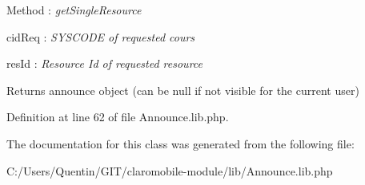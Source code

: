 \begin{DoxyPre}        Method : {\itshape getSingleResource\/}\end{DoxyPre}



\begin{DoxyPre}        cidReq : {\itshape SYSCODE of requested cours\/}\end{DoxyPre}



\begin{DoxyPre}        resId : {\itshape Resource Id of requested resource\/}\end{DoxyPre}


\begin{DoxyReturn}{Returns}
announce object (can be null if not visible for the current user) 
\end{DoxyReturn}


Definition at line 62 of file Announce.lib.php.



The documentation for this class was generated from the following file:\begin{DoxyCompactItemize}
\item 
C:/Users/Quentin/GIT/claromobile-\/module/lib/Announce.lib.php\end{DoxyCompactItemize}
